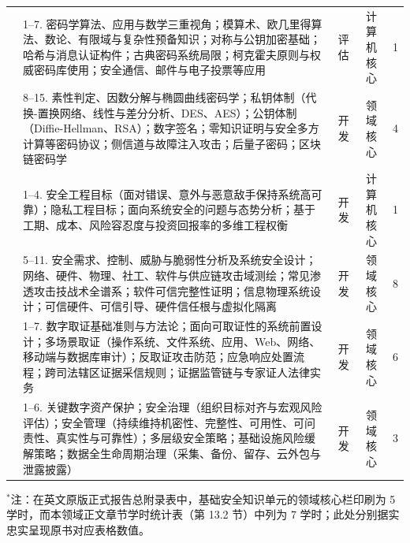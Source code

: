 \begin{tabularx}{\textwidth}{>{\raggedright\arraybackslash}p{} Y c c c}
\midrule
{} 
& 1--7. 密码学算法、应用与数学三重视角；模算术、欧几里得算法、数论、有限域与复杂性预备知识；对称与公钥加密基础；哈希与消息认证构件；古典密码系统局限；柯克霍夫原则与权威密码库使用；安全通信、邮件与电子投票等应用 & 评估 & 计算机核心 & 1 \\
& 8--15. 素性判定、因数分解与椭圆曲线密码学；私钥体制（代换-置换网络、线性与差分分析、DES、AES）；公钥体制（Diffie-Hellman、RSA）；数字签名；零知识证明与安全多方计算等密码协议；侧信道与故障注入攻击；后量子密码；区块链密码学 & 开发 & 领域核心 & 4 \\
\midrule
{} 
& 1--4. 安全工程目标（面对错误、意外与恶意敌手保持系统高可靠）；隐私工程目标；面向系统安全的问题与态势分析；基于工期、成本、风险容忍度与投资回报率的多维工程权衡 & 开发 & 计算机核心 & 1 \\
& 5--11. 安全需求、控制、威胁与脆弱性分析及系统安全设计；网络、硬件、物理、社工、软件与供应链攻击域测绘；常见渗透攻击技战术全谱系；软件可信完整性证明；信息物理系统设计；可信硬件、可信引导、硬件信任根与虚拟化隔离 & 开发 & 领域核心 & 8 \\
\midrule
{} 
& 1--7. 数字取证基础准则与方法论；面向可取证性的系统前置设计；多场景取证（操作系统、文件系统、应用、Web、网络、移动端与数据库审计）；反取证攻击防范；应急响应处置流程；跨司法辖区证据采信规则；证据监管链与专家证人法律实务 & 开发 & 领域核心 & 6 \\
\midrule
{} 
& 1--6. 关键数字资产保护；安全治理（组织目标对齐与宏观风险评估）；安全管理（持续维持机密性、完整性、可用性、可问责性、真实性与可靠性）；多层级安全策略；基础设施风险缓解策略；数据全生命周期治理（采集、备份、留存、云外包与泄露披露） & 开发 & 领域核心 & 3 \\
\bottomrule
\end{tabularx}

\vspace{4pt}
{\footnotesize\noindent$^*$注：在英文原版正式报告总附录表中，基础安全知识单元的领域核心栏印刷为 5 学时，而本领域正文章节学时统计表（第 13.2 节）中列为 7 学时；此处分别据实忠实呈现原书对应表格数值。}
\endgroup
\clearpage
\twocolumn
